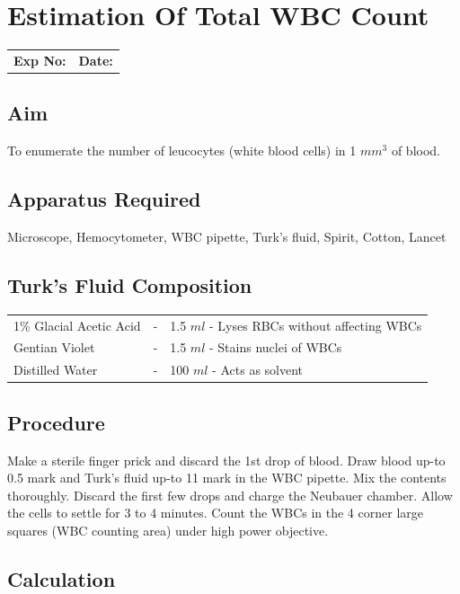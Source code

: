 \documentclass[a4paper,12pt,openany,oneside]{book}
\begin{document}
					\chapter*{\centering Estimation Of Total WBC Count}

					\begin{tabular}{p{5in} p{1in}}
						\textbf{Exp No:}  & \textbf{Date:}\\
					\end{tabular}
					\section *{Aim}
					To enumerate the number of leucocytes (white blood cells) in 1 $mm^3$ of blood.
					\section*{Apparatus Required}
					Microscope, Hemocytometer, WBC pipette, Turk’s fluid, Spirit, Cotton, Lancet
					\section*{Turk's Fluid Composition}
					\begin{tabular}{l c l}

						1\% Glacial Acetic Acid	&	-&	1.5 $ml$ - Lyses RBCs without affecting WBCs\\
						Gentian Violet&			-&	1.5 $ml$ - Stains nuclei of WBCs\\
						Distilled Water&		-&	100 $ml$ - Acts as solvent\\

					\end{tabular}
					\section*{Procedure}

					Make a sterile finger prick and discard the 1st drop of blood. Draw blood up-to 0.5 mark and Turk’s fluid up-to 11 mark in the WBC pipette. Mix the contents thoroughly. Discard the first few drops and charge the Neubauer chamber. Allow the cells to settle for 3 to 4 minutes. Count the WBCs in the 4 corner large squares (WBC counting area) under high power objective.

					\section*{Calculation}
\end{document}
